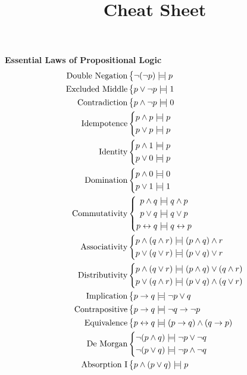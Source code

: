 \documentclass[class=cs245,nogeometry]{agony}
\title{Cheat Sheet}
\newcommand{\law}[2]{\text{#1}&\left\{\begin{aligned}#2\end{aligned}\right.\\}
\begin{document}
\begin{multicols}{2}
  \textbf{Essential Laws of Propositional Logic}
  \begin{align*}
    \law{Double Negation}{\lnot(\lnot p) \tequiv p}
    \law{Excluded Middle}{p \lor \lnot p \tequiv 1}
    \law{Contradiction}{p \land \lnot p \tequiv 0}
    \law{Idempotence}{
    p \land p                          & \tequiv p                            \\
    p \lor p                           & \tequiv p                            \\
    }
    \law{Identity}{
    p \land 1                          & \tequiv p                            \\
    p \lor 0                           & \tequiv p                            \\
    }
    \law{Domination}{
    p \land 0                          & \tequiv 0                            \\
    p \lor 1                           & \tequiv 1                            \\
    }
    \law{Commutativity}{
    p \land q                          & \tequiv q \land p                    \\
    p \lor q                           & \tequiv q \lor p                     \\
    p \harr q                          & \tequiv q \harr p                    \\
    }
    \law{Associativity}{
    p \land (q \land r)                & \tequiv (p \land q) \land r          \\
    p \lor (q \lor r)                  & \tequiv (p \lor q) \lor r            \\
    }
    \law{Distributivity}{
    p \land (q \lor r)                 & \tequiv (p \land q) \lor (q \land r) \\
    p \lor (q \land r)                 & \tequiv (p \lor q) \land (q \lor r)  \\
    }
    \law{Implication}{p \to q \tequiv \lnot p \lor q}
    \law{Contrapositive}{p \to q \tequiv \lnot q \to \lnot p}
    \law{Equivalence}{p \harr q \tequiv (p \to q) \land (q \to p)}
    \law{De Morgan}{
    \lnot(p \land q)                   & \tequiv \lnot p \lor \lnot q         \\
    \lnot(p \lor q)                    & \tequiv \lnot p \land \lnot q        \\
    }
    \law{Absorption I}{
    p \land (p \lor q)                 & \tequiv p                            \\
}
\end{align*}
\end{multicols}
\end{document}
